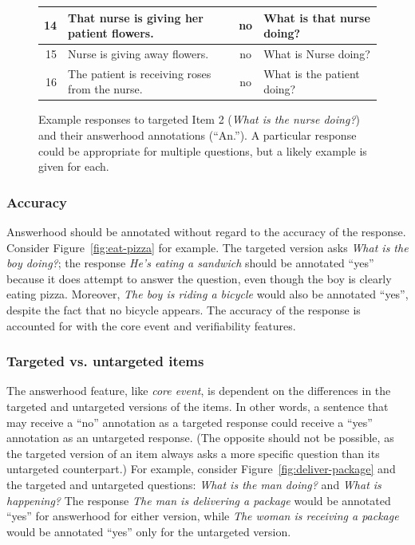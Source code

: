 \documentclass[12pt,notitlepage]{article}
\begin{document}
\begin{figure}[h!]
\begin{center}
\begin{tabular}{|r|l|c|l|}
\hline
14 & That nurse is giving her patient flowers. & no & What is that nurse doing? \\
\hline
15 & Nurse is giving away flowers. & no & What is Nurse doing? \\
\hline
16 & The patient is receiving roses from the nurse. & no & What is the patient doing?\\
\hline
\end{tabular}
\end{center}
\caption{Example responses to targeted Item 2 (\textit{What is the nurse doing?}) and their answerhood annotations (``An.''). A particular response could be appropriate for multiple questions, but a likely example is given for each.}
\label{fig:answerhood-examples}
\end{figure}


\subsubsection{Accuracy} Answerhood should be annotated without regard to the accuracy of the response. Consider Figure~\ref{fig:eat-pizza} for example. The targeted version asks \textit{What is the boy doing?}; the response \textit{He's eating a sandwich} should be annotated ``yes'' because it does attempt to answer the question, even though the boy is clearly eating pizza. Moreover, \textit{The boy is riding a bicycle} would also be annotated ``yes'', despite the fact that no bicycle appears. The accuracy of the response is accounted for with the core event and verifiability features.

\subsubsection{Targeted vs. untargeted items} The answerhood feature, like \textit{core event}, is dependent on the differences in the targeted and untargeted versions of the items. In other words, a sentence that may receive a ``no'' annotation as a targeted response could receive a ``yes'' annotation as an untargeted response. (The opposite should not be possible, as the targeted version of an item always asks a more specific question than its untargeted counterpart.) For example, consider Figure~\ref{fig:deliver-package} and the targeted and untargeted questions: \textit{What is the man doing?} and \textit{What is happening?} The response \textit{The man is delivering a package} would be annotated ``yes'' for answerhood for either version, while \textit{The woman is receiving a package} would be annotated ``yes'' only for the untargeted version.
\end{document}
